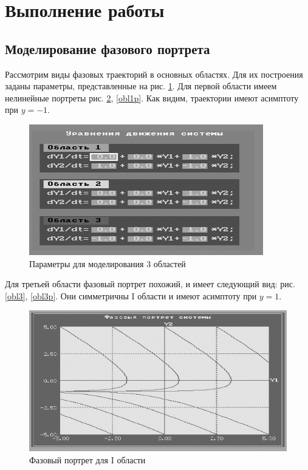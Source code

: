 	\section{Выполнение работы}
	\subsection{Моделирование фазового портрета}
	
	Рассмотрим виды фазовых траекторий в основных областях. Для их построения заданы параметры, представленные на рис. \ref{params_m}. Для первой области имеем нелинейные портреты рис. \ref{obl1}, \ref{obl1p}. Как видим, траектории имеют асимптоту при $y=-1$.
	
	\begin{figure}[h]
		\centering\includegraphics[width=.4\textwidth]{png/10.png}
		\caption{Параметры для моделирования 3 областей}
		\label{params_m}
	\end{figure}
	
	Для третьей области фазовый портрет похожий, и имеет следующий вид: рис. \ref{obl3}, \ref{obl3p}. Они симметричны I области и имеют асимптоту при $y=1$.
	
	\begin{figure}[h]
		\centering\includegraphics[width=.55\textwidth]{png/1.png}
		\caption{Фазовый портрет для I области}
		\label{obl1}
	\end{figure}

